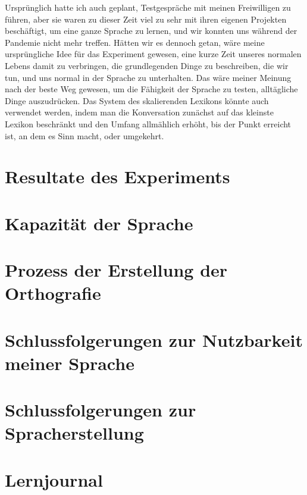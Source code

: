 \documentclass{article}
\begin{document}
Ursprünglich hatte ich auch geplant, Testgespräche mit meinen Freiwilligen zu führen,
aber sie waren zu dieser Zeit viel zu sehr mit ihren eigenen Projekten beschäftigt, um eine ganze Sprache zu lernen,
und wir konnten uns während der Pandemie nicht mehr treffen. Hätten wir es dennoch getan, wäre meine ursprüngliche
Idee für das Experiment gewesen, eine kurze Zeit unseres normalen Lebens damit zu verbringen,
die grundlegenden Dinge zu beschreiben, die wir tun, und uns normal in der Sprache zu unterhalten.
Das wäre meiner Meinung nach der beste Weg gewesen, um die Fähigkeit der Sprache zu testen, alltägliche Dinge auszudrücken.
Das System des skalierenden Lexikons könnte auch verwendet werden, indem man die Konversation zunächst auf das kleinste
Lexikon beschränkt und den Umfang allmählich erhöht, bis der Punkt erreicht ist, an dem es Sinn macht, oder umgekehrt.

\section{Resultate des Experiments}



\section{Kapazität der Sprache}



\section{Prozess der Erstellung der Orthografie}



\section{Schlussfolgerungen zur Nutzbarkeit meiner Sprache}



\section{Schlussfolgerungen zur Spracherstellung}



\section{Lernjournal}
\end{document}
